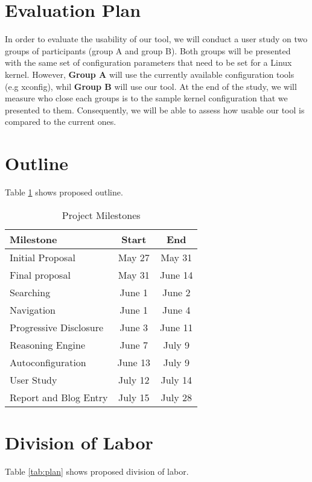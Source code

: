 \documentclass{chi2009}
\begin{document}
\section{Evaluation Plan}

In order to evaluate the usability of our tool, we will conduct a user study on two groups of participants (group A and group B). Both groups will be presented with the same set of configuration parameters that need to be set for a Linux kernel. However, \textbf{Group A} will use the currently available configuration tools (e.g xconfig), whil \textbf{Group B} will use our tool. At the end of the study, we will measure who close each groups is to the sample kernel configuration that we presented to them. Consequently, we will be able to assess how usable our tool is compared to the current ones.

\section{Outline}
Table \ref{tab:outline} shows proposed outline.

\begin{table}[!h]
\centering
\begin{tabularx}{0.5\textwidth}{X c c}
\toprule
\textbf{Milestone} & \textbf{Start} & \textbf{End}\\ \midrule
Initial Proposal & May 27 & May 31\\
Final proposal & May 31 & June 14 \\
Searching & June 1 & June 2\\
Navigation & June 1 & June 4\\
Progressive Disclosure & June 3 & June 11\\
Reasoning Engine & June 7 & July 9\\
Autoconfiguration & June 13 & July 9\\
User Study & July 12 & July 14\\
Report and Blog Entry & July 15 & July 28\\
\bottomrule
\end{tabularx}
\caption{Project Milestones}
\label{tab:outline}
\end{table}

\section{Division of Labor}
Table \ref{tab:plan} shows proposed division of labor.
\end{document}
